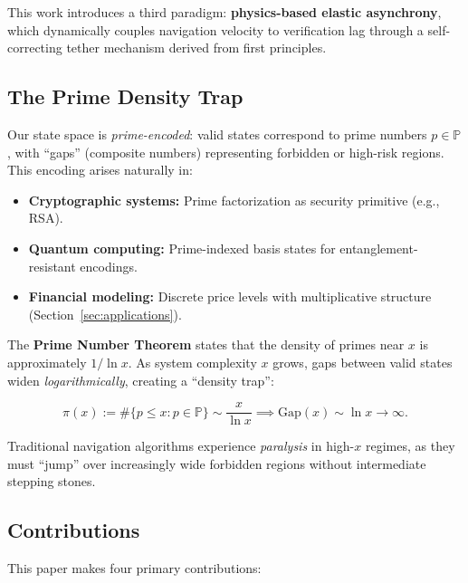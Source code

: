 \documentclass[12pt,a4paper]{article}
\begin{document}
This work introduces a third paradigm: \textbf{physics-based elastic asynchrony}, which dynamically couples navigation velocity to verification lag through a self-correcting tether mechanism derived from first principles.

\subsection{The Prime Density Trap}

Our state space is \textit{prime-encoded}: valid states correspond to prime numbers $p \in \mathbb{P}$, with ``gaps'' (composite numbers) representing forbidden or high-risk regions. This encoding arises naturally in:

\begin{itemize}
\item \textbf{Cryptographic systems:} Prime factorization as security primitive (e.g., RSA).
\item \textbf{Quantum computing:} Prime-indexed basis states for entanglement-resistant encodings.
\item \textbf{Financial modeling:} Discrete price levels with multiplicative structure (Section~\ref{sec:applications}).
\end{itemize}

The \textbf{Prime Number Theorem} states that the density of primes near $x$ is approximately $1/\ln x$. As system complexity $x$ grows, gaps between valid states widen \textit{logarithmically}, creating a ``density trap'':

\[
\pi(x) := \#\{p \le x : p \in \mathbb{P}\} \sim \frac{x}{\ln x} \implies \text{Gap}(x) \sim \ln x \to \infty.
\]

Traditional navigation algorithms experience \textit{paralysis} in high-$x$ regimes, as they must ``jump'' over increasingly wide forbidden regions without intermediate stepping stones.

\subsection{Contributions}

This paper makes four primary contributions:
\end{document}
